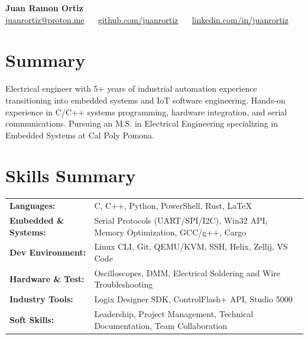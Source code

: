 \documentclass[a4paper,20pt]{article}
\begin{document}
\begin{center}
  \textbf{\LARGE Juan Ramon Ortiz} \\[4pt]
  \small
  \href{mailto:juanrortiz@proton.me}{juanrortiz@proton.me} ~\textbar~
  \href{https://github.com/juanrortiz}{github.com/juanrortiz} ~\textbar~
  \href{https://www.linkedin.com/in/juanrortiz}{linkedin.com/in/juanrortiz}
  \normalsize
\end{center}

\vspace{0pt}
\section{Summary}
\small{Electrical engineer with 5+ years of industrial automation experience transitioning into embedded systems and IoT software engineering. Hands-on experience in C/C++ systems programming, hardware integration, and serial communications. Pursuing an M.S. in Electrical Engineering specializing in Embedded Systems at Cal Poly Pomona.}
\normalsize

\vspace{2pt}
\section{Skills Summary}
\begin{tabular*}{\textwidth}{l@{\extracolsep{\fill}}l}
  \textbf{Languages:} & C, C++, Python, PowerShell, Rust, LaTeX \\[2pt]
  \textbf{Embedded \& Systems:} & Serial Protocols (UART/SPI/I2C), Win32 API, Memory Optimization, GCC/g++, Cargo \\[2pt]
  \textbf{Dev Environment:} & Linux CLI, Git, QEMU/KVM, SSH, Helix, Zellij, VS Code \\[2pt]
  \textbf{Hardware \& Test:} & Oscilloscopes, DMM, Electrical Soldering and Wire Troubleshooting \\[2pt]
  \textbf{Industry Tools:} & Logix Designer SDK, ControlFlash+ API, Studio 5000 \\[2pt]
  \textbf{Soft Skills:} & Leadership, Project Management, Technical Documentation, Team Collaboration \\ 
\end{tabular*}

\vspace{2pt}
\end{document}
